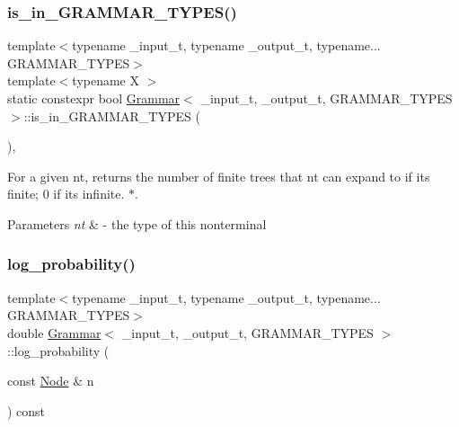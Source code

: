 \subsubsection{\texorpdfstring{is\+\_\+in\+\_\+\+G\+R\+A\+M\+M\+A\+R\+\_\+\+T\+Y\+P\+E\+S()}{is\_in\_GRAMMAR\_TYPES()}}
{\footnotesize\ttfamily template$<$typename \+\_\+input\+\_\+t, typename \+\_\+output\+\_\+t, typename... G\+R\+A\+M\+M\+A\+R\+\_\+\+T\+Y\+P\+ES$>$ \\
template$<$typename X $>$ \\
static constexpr bool \hyperlink{class_grammar}{Grammar}$<$ \+\_\+input\+\_\+t, \+\_\+output\+\_\+t, G\+R\+A\+M\+M\+A\+R\+\_\+\+T\+Y\+P\+ES $>$\+::is\+\_\+in\+\_\+\+G\+R\+A\+M\+M\+A\+R\+\_\+\+T\+Y\+P\+ES (\begin{DoxyParamCaption}{ }\end{DoxyParamCaption})\hspace{0.3cm}{\ttfamily [inline]}, {\ttfamily [static]}}



For a given nt, returns the number of finite trees that nt can expand to if its finite; 0 if its infinite. $\ast$. 


\begin{DoxyParams}{Parameters}
{\em nt} & -\/ the type of this nonterminal \\
\hline
\end{DoxyParams}
\mbox{\label{class_grammar_a44385654719beb219184074602ee7440}} 
\subsubsection{\texorpdfstring{log\+\_\+probability()}{log\_probability()}}
{\footnotesize\ttfamily template$<$typename \+\_\+input\+\_\+t, typename \+\_\+output\+\_\+t, typename... G\+R\+A\+M\+M\+A\+R\+\_\+\+T\+Y\+P\+ES$>$ \\
double \hyperlink{class_grammar}{Grammar}$<$ \+\_\+input\+\_\+t, \+\_\+output\+\_\+t, G\+R\+A\+M\+M\+A\+R\+\_\+\+T\+Y\+P\+ES $>$\+::log\+\_\+probability (\begin{DoxyParamCaption}\item[{const \hyperlink{class_node}{Node} \&}]{n }\end{DoxyParamCaption}) const\hspace{0.3cm}{\ttfamily [inline]}}

